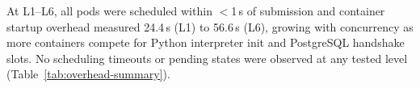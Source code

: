 At L1--L6, all pods were scheduled within $<$1\,s of submission and container startup overhead measured 24.4\,s (L1) to 56.6\,s (L6), growing with concurrency as more containers compete for Python interpreter init and PostgreSQL handshake slots.
No scheduling timeouts or pending states were observed at any tested level (Table~\ref{tab:overhead-summary}).
